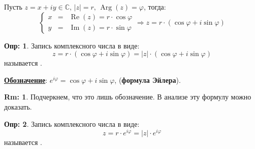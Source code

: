 \documentclass[12pt]{article}
\newcommand{\MC}{\mathbb{C}}
\theoremstyle{definition}
\newtheorem{defn}{Опр:}
\newtheorem{rem}{Rm:}
\DeclareMathOperator{\IM}{\operatorname{Im}}
\DeclareMathOperator{\RE}{\operatorname{Re}}
\DeclareMathOperator\Arg{Arg}
\begin{document}
Пусть $z = x + iy \in \MC, \, |z| = r, \, \Arg(z) = \varphi$, тогда:
$$
	\left\{
	\begin{matrix}
		x &=& \RE(z) = r{\cdot}\cos{\varphi}\\ 
		y &=& \IM(z) = r{\cdot}\sin{\varphi}
	\end{matrix}
	\right. \Rightarrow z = r{\cdot}(\cos{\varphi} + i\sin{\varphi})
$$
\begin{defn}
	Запись комплексного числа в виде:
	$$
		z = r{\cdot}(\cos{\varphi} + i\sin{\varphi}) = |z|{\cdot}(\cos{\varphi} + i\sin{\varphi})
	$$
	называется .
\end{defn}
\textbf{\uline{Обозначение}}: $e^{i \varphi} = \cos{\varphi} + i\sin{\varphi}$, (\textbf{формула Эйлера}).
\begin{rem}
	Подчеркнем, что это лишь обозначение. В анализе эту формулу можно доказать.
\end{rem}
\begin{defn}
	Запись комплексного числа в виде:
	$$
		z = r{\cdot}e^{i\varphi} = |z|{\cdot}e^{i\varphi}
	$$
	называется .
\end{defn}
\end{document}
